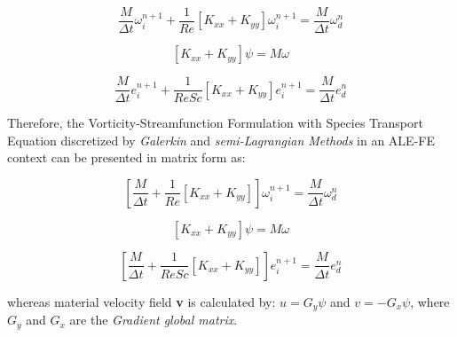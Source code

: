 \begin{equation}
 \frac{M}{\Delta t} \omega^{n+1}_{i}
 + \frac{1}{\textit{Re}} \left[ K_{xx} + K_{yy} \right] \omega^{n+1}_{i}
 = \frac{M}{\Delta t} \omega^{n}_{d}
\end{equation}

\begin{equation}
 \left[ K_{xx} + K_{yy} \right] \psi 
 =  M \omega
\end{equation}

\begin{equation}
 \frac{M}{\Delta t} e^{n+1}_{i}
 + \frac{1}{\textit{ReSc}} \left[ K_{xx} + K_{yy} \right] e^{n+1}_{i}
 = \frac{M}{\Delta t} e^{n}_{d}
\end{equation}


\medskip
Therefore, the Vorticity-Streamfunction Formulation with
Species Transport Equation discretized by \textit{Galerkin}
and \textit{semi-Lagrangian Methods} in an ALE-FE context
can be presented in matrix form as:

\begin{equation}
 \left[
 \frac{M}{\Delta t} 
 + \frac{1}{\textit{Re}} \left[ K_{xx} + K_{yy} \right]
 \right] 
 \omega^{n+1}_{i}
 = \frac{M}{\Delta t} \omega^{n}_{d}
\end{equation}

\begin{equation}
 \left[ K_{xx} + K_{yy} \right] \psi 
 =  M \omega
\end{equation}

\begin{equation}
 \left[
 \frac{M}{\Delta t} 
 + \frac{1}{\textit{ReSc}} \left[ K_{xx} + K_{yy} \right]
 \right] 
 e^{n+1}_{i}
 = \frac{M}{\Delta t} e^{n}_{d}
\end{equation}

\medskip
\noindent
whereas material velocity field \textbf{v} is calculated by:
$u =   G_{y} \psi$ and 
$v = - G_{x} \psi$, 
where 
$G_{y}$ and 
$G_{x}$ are the \textit{Gradient global matrix}.
 

